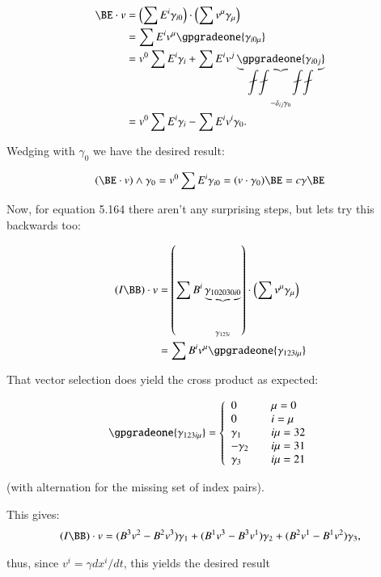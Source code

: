 \begin{align*}
\BE \cdot v
&= \left(\sum E^i \gamma_{i0}\right) \cdot \left( \sum v^{\mu} \gamma_{\mu}\right) \\
&= \sum E^i v^{\mu} \gpgradeone{ \gamma_{i0\mu}} \\
&= v^0 \sum E^i \gamma_{i} + \sum E^i v^{j} \underbrace{\gpgradeone{ \gamma_{i0j}}}_{-\delta_{ij} \gamma_0} \\
&= v^0 \sum E^i \gamma_i - \sum E^i v^i \gamma_0.
\end{align*}

Wedging with $\gamma_0$ we have the desired result:

\begin{equation*}
(\BE \cdot v) \wedge \gamma_0 = v^0 \sum E^i \gamma_{i0} = (v \cdot \gamma_0) \BE = c \gamma \BE
\end{equation*}

Now, for equation 5.164 there aren't any surprising steps, but lets try this backwards too:

\begin{align*}
(I \BB) \cdot v
&= \left(\sum B^i \underbrace{\gamma_{102030i0}}_{\gamma_{123i}} \right) \cdot \left( \sum v^{\mu} \gamma_{\mu} \right) \\
&= \sum B^i v^{\mu} \gpgradeone{\gamma_{123i\mu}}
\end{align*}

That vector selection does yield the cross product as expected:

\begin{equation*}
\gpgradeone{\gamma_{123i\mu}} =
\left\{
\begin{array}{l l}
0 & \quad \mu = 0 \\
0 & \quad i = \mu \\
\gamma_1 & \quad i\mu = 32 \\
-\gamma_2 & \quad i\mu = 31 \\
\gamma_3 & \quad i\mu = 21 \\
\end{array} \right.
\end{equation*}

(with alternation for the missing set of index pairs).

This gives:
\begin{align*}
(I \BB) \cdot v
= (B^3 v^2 - B^2 v^3) \gamma_1
+ (B^1 v^3 - B^3 v^1) \gamma_2
+ (B^2 v^1 - B^1 v^2) \gamma_3,
\end{align*}

thus, since $v^i = \gamma d{x^i}/dt$, this yields the desired result


